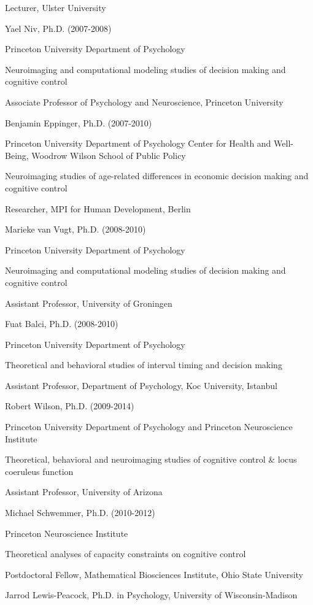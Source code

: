 \documentclass[10 pt]{article}
\begin{document}
Lecturer, Ulster University
    \medskip

Yael Niv, Ph.D. (2007-2008)

Princeton University Department of Psychology

Neuroimaging and computational modeling studies of decision making and cognitive control

Associate Professor of Psychology and Neuroscience, Princeton University
    \medskip

Benjamin Eppinger, Ph.D. (2007-2010)

Princeton University Department of Psychology
Center for Health and Well-Being, Woodrow Wilson School of Public Policy

Neuroimaging studies of age-related differences in economic decision making and cognitive control

Researcher, MPI for Human Development, Berlin
    \medskip

Marieke van Vugt, Ph.D. (2008-2010)

Princeton University Department of Psychology

Neuroimaging and computational modeling studies of decision making and cognitive control

Assistant Professor, University of Groningen
    \medskip

Fuat Balci, Ph.D. (2008-2010)

Princeton University Department of Psychology

Theoretical and behavioral studies of interval timing and decision making

Assistant Professor, Department of Psychology, Koc University, Istanbul
    \medskip

Robert Wilson, Ph.D. (2009-2014)

Princeton University Department of Psychology and Princeton Neuroscience Institute

Theoretical, behavioral and neuroimaging studies of cognitive control \& locus coeruleus function

Assistant Professor, University of Arizona
    \medskip

Michael Schwemmer, Ph.D. (2010-2012)

Princeton Neuroscience Institute

Theoretical analyses of capacity constraints on cognitive control

Postdoctoral Fellow, Mathematical Biosciences Institute, Ohio State University
    \medskip

Jarrod Lewis-Peacock, Ph.D. in Psychology, University of Wisconsin-Madison
\end{document}
